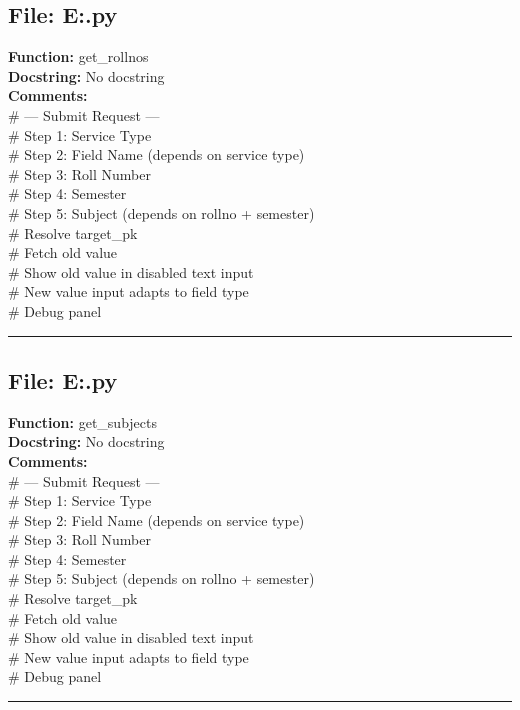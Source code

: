 {\subsection*{File: E:\project\capstone\frontend\faculty\request.py}
\textbf{Function:} get_rollnos\\
\textbf{Docstring:} No docstring\\
\textbf{Comments:}\\
# --- Submit Request ---\\
# Step 1: Service Type\\
# Step 2: Field Name (depends on service type)\\
# Step 3: Roll Number\\
# Step 4: Semester\\
# Step 5: Subject (depends on rollno + semester)\\
# Resolve target\_pk\\
# Fetch old value\\
# Show old value in disabled text input\\
# New value input adapts to field type\\
# Debug panel\\

\hrule

\subsection*{File: E:\project\capstone\frontend\faculty\request.py}
\textbf{Function:} get_subjects\\
\textbf{Docstring:} No docstring\\
\textbf{Comments:}\\
# --- Submit Request ---\\
# Step 1: Service Type\\
# Step 2: Field Name (depends on service type)\\
# Step 3: Roll Number\\
# Step 4: Semester\\
# Step 5: Subject (depends on rollno + semester)\\
# Resolve target\_pk\\
# Fetch old value\\
# Show old value in disabled text input\\
# New value input adapts to field type\\
# Debug panel\\

\hrule

}
